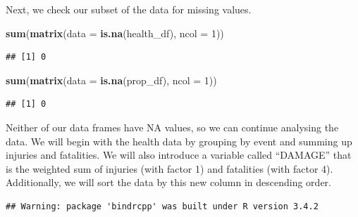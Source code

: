 \documentclass[]{article}
\newenvironment{Shaded}{\begin{snugshade}}{\end{snugshade}}
\newcommand{\KeywordTok}[1]{\textcolor[rgb]{0.13,0.29,0.53}{\textbf{{#1}}}}
\newcommand{\DataTypeTok}[1]{\textcolor[rgb]{0.13,0.29,0.53}{{#1}}}
\newcommand{\DecValTok}[1]{\textcolor[rgb]{0.00,0.00,0.81}{{#1}}}
\newcommand{\StringTok}[1]{\textcolor[rgb]{0.31,0.60,0.02}{{#1}}}
\newcommand{\NormalTok}[1]{{#1}}
\begin{document}
Next, we check our subset of the data for missing values.

\begin{Shaded}
\begin{Highlighting}[]
\KeywordTok{sum}\NormalTok{(}\KeywordTok{matrix}\NormalTok{(}\DataTypeTok{data =} \KeywordTok{is.na}\NormalTok{(health_df), }\DataTypeTok{ncol =} \DecValTok{1}\NormalTok{))}
\end{Highlighting}
\end{Shaded}

\begin{verbatim}
## [1] 0
\end{verbatim}

\begin{Shaded}
\begin{Highlighting}[]
\KeywordTok{sum}\NormalTok{(}\KeywordTok{matrix}\NormalTok{(}\DataTypeTok{data =} \KeywordTok{is.na}\NormalTok{(prop_df), }\DataTypeTok{ncol =} \DecValTok{1}\NormalTok{))}
\end{Highlighting}
\end{Shaded}

\begin{verbatim}
## [1] 0
\end{verbatim}

Neither of our data frames have NA values, so we can continue analysing
the data. We will begin with the health data by grouping by event and
summing up injuries and fatalities. We will also introduce a variable
called ``DAMAGE'' that is the weighted sum of injuries (with factor 1)
and fatalities (with factor 4). Additionally, we will sort the data by
this new column in descending order.

\begin{Shaded}
\end{Shaded}

\begin{verbatim}
## Warning: package 'bindrcpp' was built under R version 3.4.2
\end{verbatim}

\begin{Shaded}
\end{Shaded}
\end{document}
